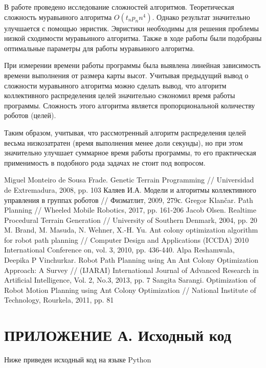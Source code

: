 \documentclass{article}
\numberwithin{equation}{section}
\begin{document}
	В работе проведено исследование сложностей алгоритмов. Теоретическая сложность муравьиного алгоритма $O(t_{n} p_{n} n^{4})$. Однако результат значительно улучшается с помощью эвристик. Эвристики необходимы для решения проблемы низкой сходимости муравьиного алгоритма. Также в ходе работы были подобраны оптимальные параметры для работы муравьиного алгоритма.

	При измерении времени работы программы была выявлена линейная зависимость времени выполнения от размера карты высот. Учитывая предыдущий вывод о сложности муравьиного алгоритма можно сделать вывод, что алгоритм коллективного распределения целей значительно сэкономил время работы программы. Сложность
	этого алгоритма является пропорциональной количеству роботов (целей).

	Таким образом, учитывая, что рассмотренный алгоритм распределения целей весьма низкозатратен (время выполнения менее доли секунды), но при этом значительно улучшает суммарное время работы программы, то его практическая применимость в подобного рода задачах не стоит под вопросом.

    \newpage
	\renewcommand\refname{ЛИТЕРАТУРА}
	\begin{thebibliography}{}
		 Miguel Monteiro de Sousa Frade. Genetic Terrain Programming // Universidad de Extremadura, 2008, pp. 103
		 Каляев И.А. Модели и алгоритмы коллективного управления в группах роботов // Физматлит, 2009, 279с.
		 Gregor Klančar. Path Planning // Wheeled Mobile Robotics, 2017, pp. 161-206
		 Jacob Olsen. Realtime Procedural Terrain Generation // University of Southern Denmark, 2004, pp. 20
		 M. Brand, M. Masuda, N. Wehner, X.-H. Yu. Ant colony optimization algorithm for robot path planning // Computer Design and Applications (ICCDA) 2010 International Conference on, vol. 3, 2010, pp. 436-440.
		 Alpa Reshamwala, Deepika P Vinchurkar. Robot Path Planning using An Ant Colony Optimization Approach: A Survey // (IJARAI) International Journal of Advanced Research in Artificial Intelligence, Vol. 2, No.3, 2013, pp. 7
		 Sangita Sarangi. Optimization of Robot Motion Planning using Ant Colony Optimization // National Institute of Technology, Rourkela, 2011, pp. 81
	\end{thebibliography}


    \newpage
	\section*{ПРИЛОЖЕНИЕ А. Исходный код} \label{sec:code}
	Ниже приведен исходный код на языке Python
	
	
	
	
	
\end{document}

